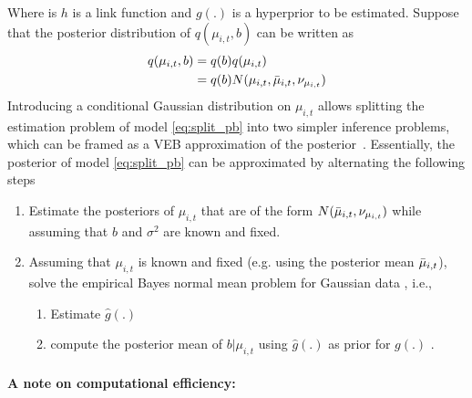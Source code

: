 Where is   $h$ is a link function and $g(.)$ is a hyperprior to be estimated. Suppose that the   posterior distribution of  $q( \mu_{i,t}  ,b)$ can be written as
 \begin{align}
q( \mu_{i,t},b)&= q(b)q( \mu_{i,t})\\
& =q(b)N( \mu_{i,t},  \Bar{\mu}_{i,t} , \nu _{\mu_{i,t}})
\end{align} 
Introducing a conditional Gaussian distribution on  $  \mu_{i,t} $ allows splitting the estimation problem of model \ref{eq:split_pb}  into two simpler inference problems, which can be framed as a VEB approximation of the posterior~\citep{blei_latent_2003}.   Essentially, the posterior of model \ref{eq:split_pb} can be approximated by alternating the following steps

\begin{enumerate}
  \item Estimate the posteriors of $\mu _{i,t}$  that are of  the form $N( \Bar{\mu}_{i,t} ,  \nu _{\mu_{i,t}}) $  while assuming  that %
   $b$ and $ \sigma^2$ are known and fixed.

    \item  Assuming that $\mu_{i,t}$ is known and fixed (e.g. using the posterior mean  $ \Bar{\mu}_{i,t} $), solve the empirical Bayes normal mean problem for Gaussian data    \citep{stephens_false_2017, willwerscheid_ebnm_2024}, i.e., 
    \begin{enumerate}
        \item  Estimate $\hat{g}(.)$
        \item compute the posterior mean of $b|\mu_{i,t}$ using $\hat{g}(.)$ as prior for $g(.)$ . 
    \end{enumerate}
\end{enumerate}







\paragraph{A note on computational efficiency:}

